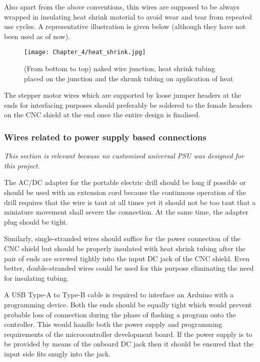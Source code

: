 Also apart from the above conventions, thin wires are supposed to be always wrapped in insulating heat shrink material to avoid wear and tear from repeated use cycles. A representative illustration is given below (although they have not been used as of now). \par
 
\begin{figure}[h]
    \centering
    \texttt{[image: Chapter\_4/heat\_shrink.jpg]}
    \caption{(From bottom to top) naked wire junction, heat shrink tubing placed on the junction and the shrunk tubing on application of heat}
    \label{fig:shrink}
\end{figure}

The stepper motor wires which are supported by loose jumper headers at the ends for interfacing purposes should preferably be soldered to the female headers on the CNC shield at the end once the entire design is finalised.

\subsubsection*{Wires related to power supply based connections}

\textit{This section is relevant because no customised universal PSU was designed for this project.}
 
The AC/DC adapter for the portable electric drill should be long if possible or should be used with an extension cord because the continuous operation of the drill requires that the wire is taut at all times yet it should not be too taut that a miniature movement shall severe the connection. At the same time, the adapter plug should be tight. \par
 
Similarly, single-stranded wires should suffice for the power connection of the CNC shield but should be properly insulated with heat shrink tubing after the pair of ends are screwed tightly into the input DC jack of the CNC shield. Even better, double-stranded wires could be used for this purpose eliminating the need for insulating tubing. \par
 
A USB Type-A to Type-B cable is required to interface an Arduino with a programming device. Both the ends should be equally tight which would prevent probable loss of connection during the phase of flashing a program onto the controller. This would handle both the power supply and programming requirements of the microcontroller development board. If the power supply is to be provided by means of the onboard DC jack then it should be ensured that the input side fits snugly into the jack.


